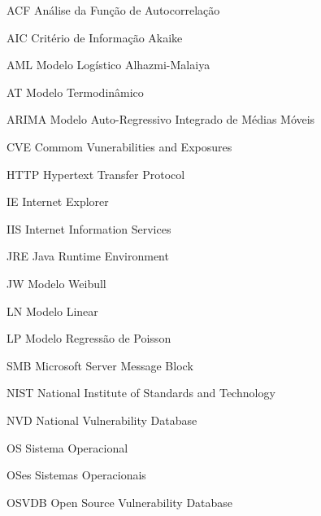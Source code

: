\begin{siglas} %
	
	
	
	
	
	
	
	
	
	
	
    \item[ACF] Análise da Função de Autocorrelação
    \item[AIC] Critério de Informação Akaike
    \item[AML] Modelo Logístico Alhazmi-Malaiya
    \item[AT] Modelo Termodinâmico
    \item[ARIMA] Modelo Auto-Regressivo Integrado de Médias Móveis
	
	
    \item[CVE] Commom Vunerabilities and Exposures
	
	
	
	
	
    \item[HTTP] Hypertext Transfer Protocol
	
	\item[IE] Internet Explorer
    \item[IIS] Internet Information Services	
    
    \item[JRE] Java Runtime Environment
    \item[JW] Modelo Weibull
	
	
    \item[LN] Modelo Linear
    \item[LP] Modelo Regressão de Poisson
	
    \item[SMB] Microsoft Server Message Block
	
    \item[NIST] National Institute of Standards and Technology
	\item[NVD] National Vulnerability Database
    
    \item[OS] Sistema Operacional
    \item[OSes] Sistemas Operacionais
    \item[OSVDB] Open Source Vulnerability Database
	

\end{siglas}
